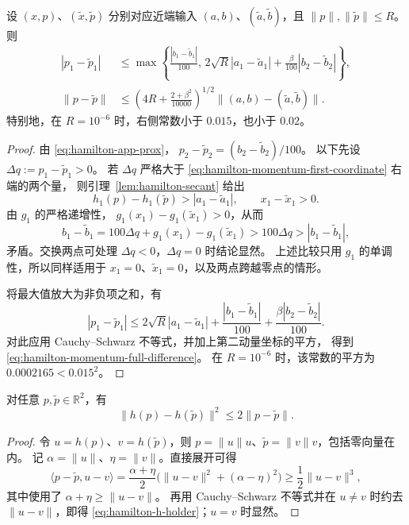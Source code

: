 \begin{lemma}[近端输出动量的两点估计]
\label{lem:hamilton-momentum-difference}
设 $(x,p)$、$(\widetilde x,\widetilde p)$ 分别对应近端输入
$(a,b)$、$(\widetilde a,\widetilde b)$，且
$\|p\|,\|\widetilde p\|\leq R$。则
\begin{align}
\label{eq:hamilton-momentum-first-coordinate}
 |p_1-\widetilde p_1|
 &\leq\max\left\{
       \frac{|b_1-\widetilde b_1|}{100},\,
       2\sqrt R|a_1-\widetilde a_1|
       +\frac{\beta}{100}|b_2-\widetilde b_2|
      \right\},\\
\label{eq:hamilton-momentum-full-difference}
 \|p-\widetilde p\|
 &\leq\left(4R+\frac{2+\beta^2}{10000}\right)^{1/2}
       \|(a,b)-(\widetilde a,\widetilde b)\|.
\end{align}
特别地，在 $R=10^{-6}$ 时，右侧常数小于 $0.015$，也小于 $0.02$。
\end{lemma}

\begin{proof}
由 \eqref{eq:hamilton-app-prox}，
$p_2-\widetilde p_2=(b_2-\widetilde b_2)/100$。
以下先设 $\Delta q:=p_1-\widetilde p_1>0$。
若 $\Delta q$ 严格大于
\eqref{eq:hamilton-momentum-first-coordinate} 右端的两个量，
则引理~\ref{lem:hamilton-secant} 给出
\[
 h_1(p)-h_1(\widetilde p)>|a_1-\widetilde a_1|,
 \qquad x_1-\widetilde x_1>0.
\]
由 $g_1$ 的严格递增性，
$g_1(x_1)-g_1(\widetilde x_1)>0$，从而
\[
 b_1-\widetilde b_1
 =100\Delta q+g_1(x_1)-g_1(\widetilde x_1)
 >100\Delta q>|b_1-\widetilde b_1|,
\]
矛盾。交换两点可处理 $\Delta q<0$，$\Delta q=0$ 时结论显然。
上述比较只用 $g_1$ 的单调性，所以同样适用于
$x_1=0$、$\widetilde x_1=0$，以及两点跨越零点的情形。

将最大值放大为非负项之和，有
\[
 |p_1-\widetilde p_1|
 \leq2\sqrt R|a_1-\widetilde a_1|
       +\frac{|b_1-\widetilde b_1|}{100}
       +\frac{\beta|b_2-\widetilde b_2|}{100}.
\]
对此应用 Cauchy--Schwarz 不等式，并加上第二动量坐标的平方，
得到 \eqref{eq:hamilton-momentum-full-difference}。
在 $R=10^{-6}$ 时，该常数的平方为 $0.0002165<0.015^2$。
\end{proof}

\begin{lemma}
\label{lem:hamilton-h-holder}
对任意 $p,\widetilde p\in\mathbb R^2$，有
\begin{equation}
\label{eq:hamilton-h-holder}
 \|h(p)-h(\widetilde p)\|^2\leq2\|p-\widetilde p\|.
\end{equation}
\end{lemma}

\begin{proof}
令 $u=h(p)$、$v=h(\widetilde p)$，则
$p=\|u\|u$、$\widetilde p=\|v\|v$，包括零向量在内。
记 $\alpha=\|u\|$、$\eta=\|v\|$。直接展开可得
\[
 \langle p-\widetilde p,u-v\rangle
 =\frac{\alpha+\eta}{2}
   \bigl(\|u-v\|^2+(\alpha-\eta)^2\bigr)
 \geq\frac12\|u-v\|^3,
\]
其中使用了 $\alpha+\eta\geq\|u-v\|$。
再用 Cauchy--Schwarz 不等式并在 $u\ne v$ 时约去
$\|u-v\|$，即得 \eqref{eq:hamilton-h-holder}；$u=v$ 时显然。
\end{proof}

